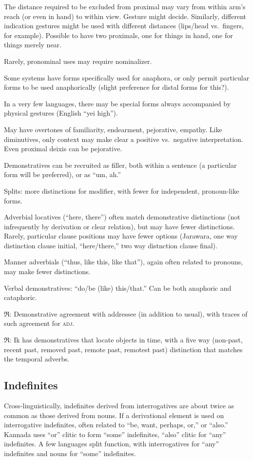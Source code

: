\documentclass[11pt]{article}
\newcommand{\I}[1]{\textsc{#1}}   %
\newcommand{\rara}[1]{$\mathfrak{R}$: #1}
\begin{document}
The distance required to be excluded from proximal may vary from
within arm's reach (or even in hand) to within view.  Gesture might
decide.  Similarly, different indication gestures might be used with
different distances (lips/head vs.\ fingers, for example).  Possible
to have two proximals, one for things in hand, one for things merely
near.

Rarely, pronominal uses may require nominalizer.

Some systems have forms specifically used for anaphora, or only permit
particular forms to be used anaphorically (slight preference for
distal forms for this?).

In a very few languages, there may be special forms always accompanied
by physical gestures (English ``yei high'').

May have overtones of familiarity, endearment, pejorative,
empathy.  Like diminutives, only context may make clear a positive
vs.\ negative interpretation.  Even proximal deixis can be
pejorative. 

Demonstratives can be recruited as filler, both within a sentence (a
particular form will be preferred), or as ``um, ah.''

Splits: more distinctions for modifier, with fewer for independent,
pronoun-like forms. 

Adverbial locatives (``here, there'') often match demonstrative
distinctions (not infrequently by derivation or clear relation), but
may have fewer distinctions.  Rarely, particular clause positions may
have fewer options (Jarawara, one way distinction clause initial,
``here/there,'' two way distnction clause final).

Manner adverbials (``thus, like this, like that''), again often
related to pronouns, may make fewer distinctions.

Verbal demonstratives: ``do/be (like) this/that.'' Can be both
anaphoric and cataphoric.

\rara{Demonstrative agreement with addressee (in addition to usual),
  with traces of such agreement for \I{adj}.}

\rara{Ik has demonstratives that locate objects in time, with a
five way (non-past, recent past, removed past, remote past, remotest
past) distinction that matches the temporal adverbs.}

\subsection{Indefinites}
Cross-linguistically, indefinites derived from interrogatives are about
twice as common as those derived from nouns. If a derivational element
is used on interrogative indefinites, often related to ``be, want,
perhaps, or,'' or ``also.''  Kannada uses ``or'' clitic to form
``some'' indefinites, ``also'' clitic for ``any'' indefinites.  A few
languages split function, with interrogatives for ``any'' indefinites
and nouns for ``some'' indefinites.
\end{document}
